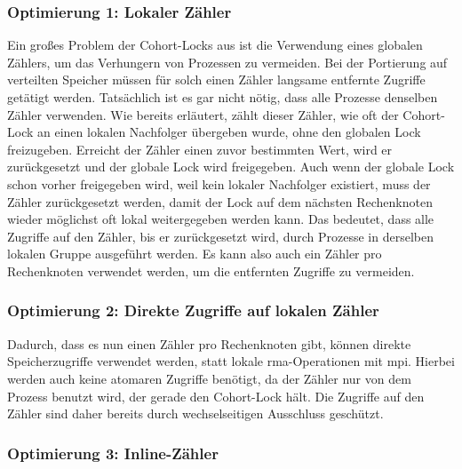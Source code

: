 \subsubsection{Optimierung 1: Lokaler Zähler}
\label{sec:cohort_opt_1}

Ein großes Problem der Cohort-Locks aus \cite{Cohort-Lock} ist die Verwendung eines globalen Zählers,
um das \gls{Verhungern} von Prozessen zu vermeiden.
Bei der Portierung auf verteilten Speicher müssen für solch einen Zähler langsame entfernte Zugriffe getätigt werden.
Tatsächlich ist es gar nicht nötig,
dass alle Prozesse denselben Zähler verwenden.
Wie bereits erläutert,
zählt dieser Zähler,
wie oft der Cohort-Lock an einen lokalen Nachfolger übergeben wurde,
ohne den globalen Lock freizugeben.
Erreicht der Zähler einen zuvor bestimmten Wert,
wird er zurückgesetzt und der globale Lock wird freigegeben.
Auch wenn der globale Lock schon vorher freigegeben wird,
weil kein lokaler Nachfolger existiert,
muss der Zähler zurückgesetzt werden,
damit der Lock auf dem nächsten Rechenknoten wieder möglichst oft lokal weitergegeben werden kann.
Das bedeutet,
dass alle Zugriffe auf den Zähler,
bis er zurückgesetzt wird,
durch Prozesse in derselben lokalen Gruppe ausgeführt werden.
Es kann also auch ein Zähler pro Rechenknoten verwendet werden,
um die entfernten Zugriffe zu vermeiden.

\subsubsection{Optimierung 2: Direkte Zugriffe auf lokalen Zähler}
\label{sec:cohort_opt_2}

Dadurch,
dass es nun einen Zähler pro Rechenknoten gibt,
können direkte Speicherzugriffe verwendet werden,
statt lokale \gls{rma}-Operationen mit \gls{mpi}.
Hierbei werden auch keine atomaren Zugriffe benötigt,
da der Zähler nur von dem Prozess benutzt wird,
der gerade den Cohort-Lock hält.
Die Zugriffe auf den Zähler sind daher bereits durch wechselseitigen Ausschluss geschützt.

\subsubsection{Optimierung 3: Inline-Zähler}
\label{sec:cohort_opt_3}

